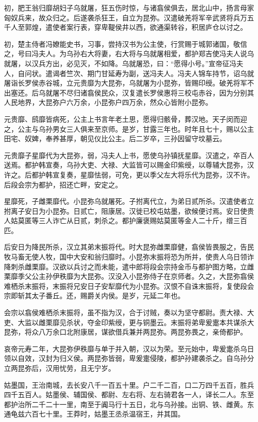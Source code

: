 \documentclass[]{article}
\begin{document}
初，肥王翁归靡胡妇子乌就屠，狂五伤时惊，与诸翕侯俱去，居北山中，扬言母家匈奴兵来，故众归之。后遂袭杀狂王，自立为昆弥。汉遣破羌将军辛武贤将兵万五千人至郭煌，遣使者案行表，穿卑鞮侯井以西，欲通渠转谷，积居庐仓以讨之。

初，楚主侍者冯嫽能史书，习事，尝持汉书为公主使，行赏赐于城郭诸国，敬信之，号曰冯夫人。为乌孙右大将妻，右大将与乌就屠相爱，都护郑吉使冯夫人说乌就屠，以汉兵方出，必见灭，不如降。乌就屠恐，曰：``愿得小号。''宣帝征冯夫人，自问状。遣谒者竺次、期门甘延寿为副，送冯夫人。冯夫人锦车持节，诏乌就屠诣长罗侯赤谷城，立元贵靡为大昆弥，乌就屠为小昆弥，皆赐印绶。破羌将军不出塞还。后乌就屠不尽归诸翕侯民众，汉复遣长罗侯惠将三校屯赤谷，因为分别其人民地界，大昆弥户六万余，小昆弥户四万余，然众心皆附小昆弥。

元贵靡、鸱靡皆病死，公主上书言年老土思，愿得归骸骨，葬汉地。天子闵而迎之，公主与乌孙男女三人俱来至京师。是岁，甘露三年也。时年且七十，赐以公主田宅、奴婢，奉养甚厚，朝见仪比公主。后二岁卒，三孙因留守坟墓云。

元贵靡子星靡代为大昆弥，弱，冯夫人上书，愿使乌孙镇抚星靡。汉遣之，卒百人送焉。都护韩宣奏，乌孙大吏、大禄、大监皆可以赐金印紫绶，以尊辅大昆弥，汉许之。后都护韩宣复奏，星靡怯弱，可免，更以季父左大将乐代为昆弥，汉不许。后段会宗为都护，招还亡畔，安定之。

星靡死，子雌栗靡代。小昆弥乌就屠死。子拊离代立，为弟日贰所杀。汉遣使者立拊离子安日为小昆弥。日贰亡，阻康居。汉徙已校屯姑墨，欲候便讨焉。安日使贵人姑莫匿等三人诈亡从日贰，刺杀之。都护廉褒赐姑莫匿等金人二十斤，缯三百匹。

后安日为降民所杀，汉立其弟末振将代。时大昆弥雌栗靡健，翕侯皆畏服之，告民牧马畜无使人牧，国中大安和翁归靡时。小昆弥末振将恐为所并，使贵人乌日领诈降刺杀雌栗靡。汉欲以兵讨之而未能，遣中郎将段会宗持金币与都护图方略，立雌栗靡季父公主孙伊秩靡为大昆弥。汉没入小昆弥侍子在京师者。久之，大昆弥翕侯难栖杀末振将，末振将兄安日子安犁靡代为小昆弥。汉恨不自诛末振将，复使段会宗即斩其太子番丘。还，赐爵关内侯。是岁，元延二年也。

会宗以翕侯难栖杀末振将，虽不指为汉，合于讨贼，奏以为坚守都尉。责大禄、大吏、大监以雌栗靡见杀状，夺金印紫绶，更与铜墨云。末振将弟卑爰疐本共谋杀大昆弥，将众八万余口北附康居，谋欲借兵兼并两昆弥。两昆弥畏之，亲倚都护。

哀帝元寿二年，大昆弥伊秩靡与单于并入朝，汉以为荣。至元始中，卑爰疐杀乌日领以自效，汉封为归义侯。两昆弥皆弱，卑爰疐侵陵，都护孙建袭杀之。自乌孙分立两昆弥后，汉用忧劳，且无宁岁。

姑墨国，王治南城，去长安八千一百五十里。户二千二百，口二万四千五百，胜兵四千五百人。姑墨侯、辅国侯、都尉、左右将、左右骑君各一人，译长二人。东至都护治所二千二十一里，南至于阗马行十五日，北与乌孙接。出铜、铁、雌黄。东通龟兹六百七十里。王莽时，姑墨王丞杀温宿王，并其国。
\end{document}
